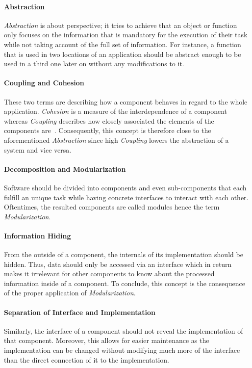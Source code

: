 \documentclass[12pt,a4paper,twoside]{report}
\begin{document}
\paragraph{Abstraction}
\textit{Abstraction} is about perspective; it tries to achieve that an object or
function only focuses on the information that is mandatory for the execution of
their task while not taking account of the full set of information.
For instance, a function that is used in two locations of an application
should be abstract enough to be used in a third one later on without
any modifications to it.

\paragraph{Coupling and Cohesion}
These two terms are describing how a component behaves in regard to the whole application.
\textit{Cohesion} is a measure of the interdependence of a component whereas
\textit{Coupling} describes how closely associated the elements of the
components are~\cite{mcconnell-code-complete, swebok}.
Consequently, this concept is therefore close to the aforementioned \textit{Abstraction}
since high \textit{Coupling} lowers the abstraction of a system and vice versa.

\paragraph{Decomposition and Modularization}
Software should be divided into components and even sub-components that each fulfill
an unique task while having concrete interfaces to interact with each other.
Oftentimes, the resulted components are called modules hence the term \textit{Modularization}.

\paragraph{Information Hiding}
From the outside of a component, the internals of its implementation should be hidden.
Thus, data should only be accessed via an interface which in return makes it irrelevant
for other components to know about the processed information inside of a component.
To conclude, this concept is the consequence of the proper application of \textit{Modularization}.

\paragraph{Separation of Interface and Implementation}
Similarly, the interface of a component should not reveal the implementation of
that component. Moreover, this allows for easier maintenance as the implementation
can be changed without modifying much more of the interface than the direct connection
of it to the implementation.
\end{document}
